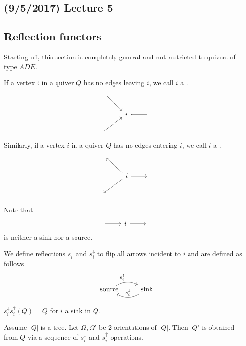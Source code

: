 \documentclass[11pt,leqno,oneside]{amsbook}
\numberwithin{thm}{section}
\renewcommand{\Q}{Q} %
\newcommand{\sinktosource}{s^\downarrow} %
\newcommand{\sourcetosink}{s^\uparrow} %
\begin{document}
\subsection*{(9/5/2017) Lecture 5}
\subsection{Reflection functors}
Starting off, this section is completely general and not restricted to
quivers of type \(ADE\).
\begin{defn}
  If a vertex \(i\) in a quiver \(\Q\) has no edges leaving \(i\), we
  call \(i\) a . \[ 
    \begin{tikzcd}
      \ar[rd]& & \\
      & i & \lar \\
      \ar[ru] & & 
    \end{tikzcd}
  \]
  Similarly, if a vertex \(i\) in a quiver \(\Q\) has no edges
  entering \(i\), we call \(i\) a . \[
  \begin{tikzcd}
      \ & & \\
      & i \ar[r] \ar[lu] \ar[ld] & \  \\
      \ & & 
    \end{tikzcd}
  \]
\end{defn}
\begin{rmk}
  Note that \[
    \begin{tikzcd}
      \ar[r] & i \ar[r] & \
    \end{tikzcd}
  \]
  is neither a sink nor a source.
\end{rmk}
\begin{defn}
  We define reflections \(\sourcetosink_i\) and \(\sinktosource_i\) to flip
  all arrows incident to \(i\) and are defined as
  follows \[
    \begin{tikzcd}
      \text{source} \ar[r, bend left, "\sourcetosink_i"] & \ar[l, bend
      left, swap, "\sinktosource_i"] \text{sink}
    \end{tikzcd}
  \]
\end{defn}
\begin{prop}
  \(\sinktosource_i \sourcetosink_i (\Q) = \Q\)  for \(i\) a sink in \(\Q\).
\end{prop}
\begin{prop}
  Assume \(|\Q|\) is a tree. Let \(\Omega, \Omega'\) be 2
  orientations of \(|\Q|\). Then, \(\Q'\) is obtained from \(\Q\) via
  a sequence of \(\sinktosource_i\) and \(\sourcetosink_i\) operations.
\end{prop}
\end{document}
